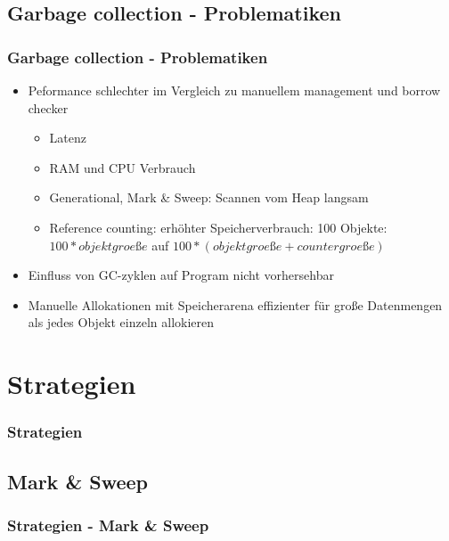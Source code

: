 \documentclass{beamer}
\begin{document}
        \subsection{Garbage collection - Problematiken}
            \begin{frame}
                \frametitle{Garbage collection - Problematiken}
                \begin{itemize}
                    \item Peformance schlechter im Vergleich zu manuellem
                        management und borrow checker
                        \begin{itemize}
                            \item Latenz 
                            \item RAM und CPU Verbrauch
                            \item Generational, Mark \& Sweep: Scannen vom Heap langsam
                            \item Reference counting: erhöhter Speicherverbrauch: 100 Objekte: $100*objektgroeße$ auf $100*(objektgroeße+countergroeße)$
                        \end{itemize}
                    \item Einfluss von GC-zyklen auf Program nicht vorhersehbar
                    \item Manuelle Allokationen mit Speicherarena effizienter
                        für große Datenmengen als jedes Objekt einzeln
                        allokieren
                \end{itemize}
            \end{frame}

    \section{Strategien}
        \begin{frame}
            \frametitle{Strategien}
        \end{frame}

        \subsection{Mark \& Sweep}
            \begin{frame}
                \frametitle{Strategien - Mark \& Sweep}
            \end{frame}
\end{document}
